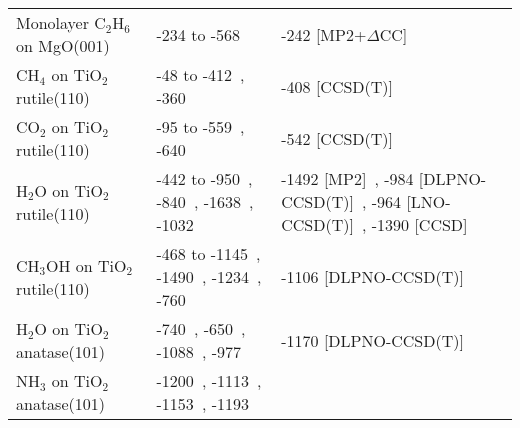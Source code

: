 \begin{table}
\begin{adjustbox}{center}
\begin{tabular}{lp{7cm}p{7cm}}
Monolayer C$_2$H$_6$ on MgO(001) & -234 to -568~\cite{r.rehakIncludingDispersionDensity2020} & -242 [MP2+$\Delta$CC]~\cite{alessioChemicallyAccurateAdsorption2018} \\
CH$_4$ on TiO$_2$ rutile(110) & -48 to -412~\cite{kubasSurfaceAdsorptionEnergetics2016c}, -360~\cite{tillotsonAdsorptionOrganicMolecules2015} & -408 [CCSD(T)]~\cite{kubasSurfaceAdsorptionEnergetics2016c} \\
CO$_2$ on TiO$_2$ rutile(110) & -95 to -559~\cite{kubasSurfaceAdsorptionEnergetics2016c}, -640~\cite{kovacicElectronicPropertiesRutile2022} & -542 [CCSD(T)]~\cite{kubasSurfaceAdsorptionEnergetics2016c} \\
H$_2$O on TiO$_2$ rutile(110) & -442 to -950~\cite{kubasSurfaceAdsorptionEnergetics2016c}, -840~\cite{liuStructureDynamicsLiquid2010b}, -1638~\cite{banduraAdsorptionWaterTiO22004a}, -1032~\cite{sorescuCoadsorptionPropertiesCO22012} & -1492 [MP2]~\cite{stefanovichInitioStudyWater1999}, -984 [DLPNO-CCSD(T)]~\cite{kubasSurfaceAdsorptionEnergetics2016c}, -964 [LNO-CCSD(T)]~\cite{yeInitioSurfaceChemistry2024}, -1390 [CCSD]~\cite{schaferLocalEmbeddingCoupled2021b} \\
CH$_3$OH on TiO$_2$ rutile(110) & -468 to -1145~\cite{kubasSurfaceAdsorptionEnergetics2016c}, -1490~\cite{kieuTrendsAdsorptionEnergy2002}, -1234~\cite{batesAdsorptionDissociationROH1998}, -760~\cite{langFirstPrinciplesStudyMethanol2014} & -1106 [DLPNO-CCSD(T)]~\cite{kubasSurfaceAdsorptionEnergetics2016c} \\
H$_2$O on TiO$_2$ anatase(101) & -740~\cite{vittadiniStructureEnergeticsWater1998}, -650~\cite{millerEffectsWaterFormic2011}, -1088~\cite{onalAdsorptionWaterAmmonia2006}, -977~\cite{zhaoStructurePropertiesWater2012} & -1170 [DLPNO-CCSD(T)]~\cite{petersenWaterAdsorptionIdeal2020} \\
NH$_3$ on TiO$_2$ anatase(101) & -1200~\cite{koustNH3AdsorptionAnataseTiO22018a}, -1113~\cite{onalAdsorptionWaterAmmonia2006}, -1153~\cite{wanbayorAdsorptionCOH22010}, -1193~\cite{changAdsorptionConfigurationDissociative2009} &  \\
\bottomrule
\end{tabular}
\end{adjustbox}

\end{table}